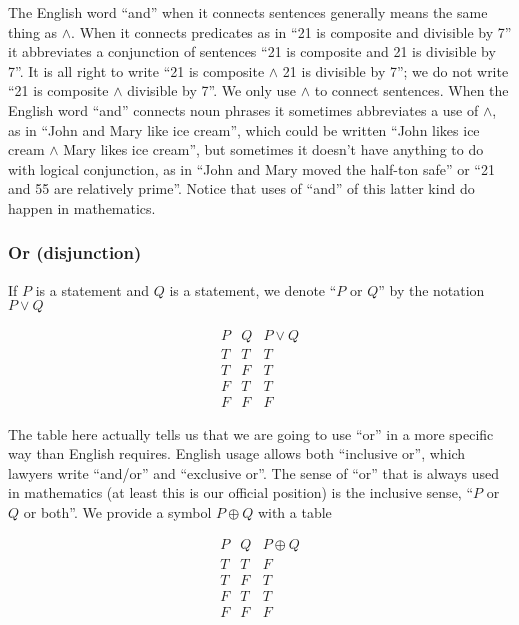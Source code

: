 \documentclass[12pt]{article}
\begin{document}
The English word ``and'' when it
connects sentences generally means the same thing as $\wedge$.  When
it connects predicates as in ``21 is composite and divisible by 7'' it
abbreviates a conjunction of sentences ``21 is composite and 21 is
divisible by 7''.  It is all right to write ``21 is composite $\wedge$
21 is divisible by 7''; we do not write ``21 is composite $\wedge$
divisible by 7''.  We only use $\wedge$ to connect sentences.  When
the English word ``and'' connects noun phrases it sometimes
abbreviates a use of $\wedge$, as in ``John and Mary like ice cream'',
which could be written ``John likes ice cream $\wedge$ Mary likes ice
cream'', but sometimes it doesn't have anything to do with logical
conjunction, as in ``John and Mary moved the half-ton safe'' or ``21
and 55 are relatively prime''.  Notice that uses of ``and'' of this
latter kind do happen in mathematics.

\subsubsection{Or (disjunction)}

If $P$ is a statement and $Q$ is a statement, we denote ``$P$ or $Q$'' by the notation $P \vee Q$

$$\begin{array}{c|c|c} P  & Q & P \vee Q \\ \hline
                       T  & T &   T  \\
                       T  & F &   T  \\
                       F  & T &   T  \\
                       F  & F &   F \end{array}$$

The table here actually tells us that we are going to use ``or'' in a
more specific way than English requires.  English usage allows both
``inclusive or'', which lawyers write ``and/or'' and ``exclusive or''.
The sense of ``or'' that is always used in mathematics (at least this
is our official position) is the inclusive sense, ``$P$ or $Q$ or
both''.  We provide a symbol $P \oplus Q$ with a table 

$$\begin{array}{c|c|c} P  & Q & P \oplus Q \\ \hline
                       T  & T &   F  \\
                       T  & F &   T  \\
                       F  & T &   T  \\
                       F  & F &   F \end{array}$$
\end{document}
